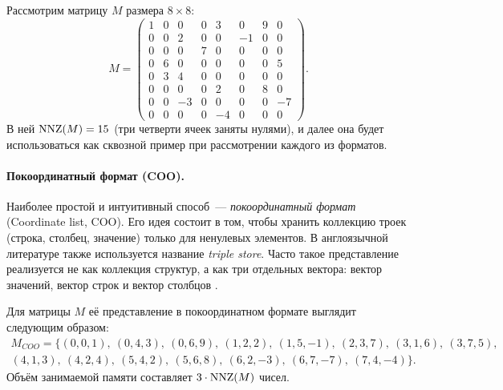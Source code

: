 \begin{example}
    \label{exmpl:SparseMatrixM}
    Рассмотрим матрицу $M$ размера $8 \times 8$:
    \[
        M=
        \begin{pmatrix}
            1 & 0 & 0  & 0 & 3 & 0  & 9 & 0 \\
            0 & 0 & 2  & 0 & 0 & -1 & 0 & 0 \\
            0 & 0 & 0  & 7 & 0 & 0  & 0 & 0 \\
            0 & 6 & 0  & 0 & 0 & 0  & 0 & 5 \\
            0 & 3 & 4  & 0 & 0 & 0  & 0 & 0 \\
            0 & 0 & 0  & 0 & 2 & 0  & 8 & 0 \\
            0 & 0 & -3 & 0 & 0 & 0  & 0 & -7 \\
            0 & 0 & 0  & 0 & -4& 0  & 0 & 0
        \end{pmatrix}.
    \]
    В ней $\operatorname{NNZ}(M) = 15$ (три четверти ячеек заняты нулями), и далее она будет использоваться как сквозной пример при рассмотрении каждого из форматов.
\end{example}

\paragraph{Покоординатный формат (COO).}
Наиболее простой и интуитивный способ~--- \emph{покоординатный формат} (Coordinate list, COO).
Его идея состоит в том, чтобы хранить коллекцию троек (строка, столбец, значение) только для ненулевых элементов.
В англоязычной литературе также используется название \emph{triple store}.
Часто такое представление реализуется не как коллекция структур, а как три отдельных вектора: вектор значений, вектор строк и вектор столбцов%
.

\begin{example}
    Для матрицы $M$ её представление в покоординатном формате выглядит следующим образом:
    \begin{multline*}
        M_{\textit{COO}} = \{(0,0,1),\ (0,4,3),\ (0,6,9),\ (1,2,2),\ (1,5,-1),\ (2,3,7),\ (3,1,6),\ (3,7,5),\\
                                 (4,1,3),\ (4,2,4),\ (5,4,2),\ (5,6,8),\ (6,2,-3),\ (6,7,-7),\ (7,4,-4)\}.
    \end{multline*}
    Объём занимаемой памяти составляет $3 \cdot \operatorname{NNZ}(M)$ чисел.
\end{example}

